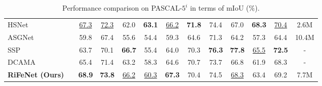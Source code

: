 \documentclass[letterpaper]{article} %
\begin{document}
\begin{table}[!t]
\begin{threeparttable}
{\begin{tabular}{l|c|ccccc|ccccc|c}
HSNet~\citeyear{tao2020hierarchical}    	& 							&\underline{67.3}&\underline{72.3}&62.0&\textbf{63.1}&\underline{66.2}	&\textbf{71.8}&74.4&67.0&\textbf{68.3}&\underline{70.4}	&2.6M\\
ASGNet~\citeyear{li2021adaptive}		&							&59.8&67.4&55.6&54.4&59.3	&64.6&71.3&64.2&57.3&64.4&10.4M\\
SSP~\citeyear{fan2022self}		&							&63.7&70.1&\textbf{66.7}&55.4&64.0  &70.3&\textbf{76.3}&\textbf{77.8}&\underline{65.5}&\textbf{72.5}&-	\\
DCAMA~\citeyear{shi2022dense}		&							&65.4&71.4&63.2&58.3&64.6	&70.7&73.7&66.8&61.9&68.3&-	\\
\textbf{RiFeNet (Ours)}&							&\textbf{68.9}&\textbf{73.8}&\underline{66.2}&\underline{60.3}&\textbf{67.3}	&70.4&74.5&\underline{68.3}&63.4&69.2&7.7M\\
\bottomrule[1pt]
\end{tabular}}
\end{threeparttable}
\caption{Performance comparison on PASCAL-$5^i$ in terms of mIoU ($\%$).}
\label{sotapascal}
\end{table}
\end{document}
